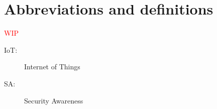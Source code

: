 \chapter{Abbreviations and definitions}
\textcolor{red}{WIP}

\begin{description}
    \item[IoT: ] Internet of Things 
    \item[SA: ] Security Awareness
\end{description}